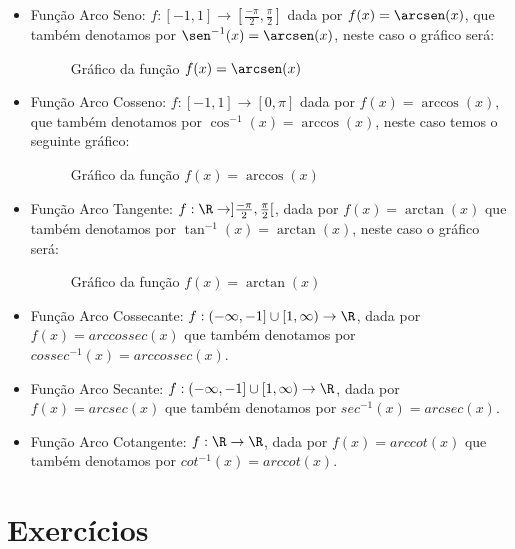 \begin{itemize}
  \textbf{Funções Inversas}

  As funções trigonométricas admitem inversas quando restringimos seus domínios a um único período da função, assim temos por exemplo as seguintes funções:

  \item Função Arco Seno: $f: [-1, 1] \rightarrow [\frac{-\pi}{2}, \frac{\pi}{2}]$ dada por $f(x)= \arcsen(x)$, que também denotamos por $\sen^{-1}(x)= \arcsen(x)$, neste caso o gráfico será:

  \begin{figure}[H]
  \centering
    \caption{Gráfico da função $f(x)= \arcsen(x)$}
  \end{figure}


  \item Função Arco Cosseno: $f: [-1, 1] \rightarrow [0, \pi]$ dada por $f(x)= \arccos(x)$, que também denotamos por $\cos^{-1}(x)= \arccos (x)$, neste caso temos o seguinte gráfico:

  \begin{figure}[H]
  \centering
    \caption{Gráfico da função $f(x)= \arccos(x)$}
  \end{figure}


  \item Função Arco Tangente: $f: \R \rightarrow ]\frac{-\pi}{2}, \frac{\pi}{2}[$, dada por $f(x)= \arctan(x)$ que também denotamos por $\tan^{-1}(x)= \arctan (x)$, neste caso o gráfico será:

  \begin{figure}[H]
  \centering
    \caption{Gráfico da função $f(x)= \arctan(x)$}
  \end{figure}

\item Função Arco Cossecante: $f: (-\infty, -1] \cup [1, \infty) \rightarrow \R$, dada por $f(x)= arc cossec(x)$ que também denotamos por $cossec^{-1}(x)= arc cossec(x)$.

\item Função Arco Secante: $f: (-\infty, -1] \cup [1, \infty) \rightarrow \R$, dada por $f(x)= arc sec(x)$ que também denotamos por $sec^{-1}(x)= arc sec(x)$.

\item Função Arco Cotangente: $f: \R \rightarrow \R$, dada por $f(x)= arc cot(x)$ que também denotamos por $cot^{-1}(x)= arc cot(x)$.

  \end{itemize}

\section{Exercícios}

\construirExer
